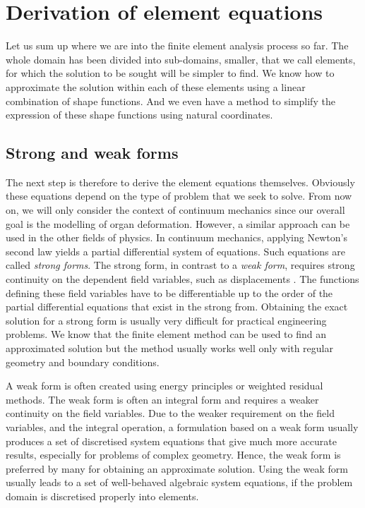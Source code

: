 	
\section{Derivation of element equations}	

Let us sum up where we are into the finite element analysis process so far. The whole domain has been divided into sub-domains, smaller, that we call elements, for which the solution to be sought will be simpler to find. We know how to approximate the solution within each of these elements using a linear combination of shape functions. And we even have a method to simplify the expression of these shape functions using natural coordinates. 

	\subsection{Strong and weak forms}
	
The next step is therefore to derive the element equations themselves. Obviously these equations depend on the type of problem that we seek to solve. From now on, we will only consider the context of continuum mechanics since our overall goal is the modelling of organ deformation. However, a similar approach can be used in the other fields of physics. In continuum mechanics, applying Newton's second law yields a partial differential system of equations. Such equations are called \emph{strong forms}. The strong form, in contrast to a \emph{weak form}, requires strong continuity on the dependent field variables, such as displacements \citep{Liu03}. The functions defining these field variables have to be differentiable up to the order of the partial differential equations that exist in the strong from. Obtaining the exact solution for a strong form is usually very difficult for practical engineering problems. We know that the finite element method can be used to find an approximated solution but the method usually works well only with regular geometry and boundary conditions.

A weak form is often created using energy principles or weighted residual methods. The weak form is often an integral form and requires a weaker continuity on the field variables. Due to the weaker requirement on the field variables, and the integral operation, a formulation based on a weak form usually produces a set of discretised system equations that give much more accurate results, especially for problems of complex geometry. Hence, the weak form is preferred by many for obtaining an approximate solution. Using the weak form usually leads to a set of well-behaved algebraic system equations, if the problem domain is discretised properly into elements.

